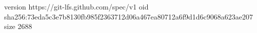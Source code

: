 version https://git-lfs.github.com/spec/v1
oid sha256:73eda5c3e7b8130fb985f2363712d06a467ea80712a6f9d1d6c9068a623ae207
size 2688
